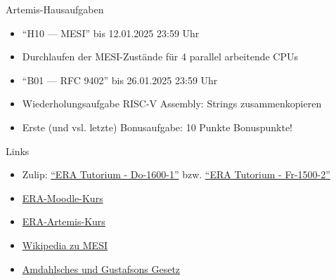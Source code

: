 \documentclass[
  german,            %
  aspectratio=169,    %
]{tumbeamer}
\begin{document}
\begin{frame}[c, fragile]{Artemis-Hausaufgaben}{}
	\begin{itemize}
		\item \enquote{H10 --- MESI} bis 12.01.2025 23:59 Uhr
		\item Durchlaufen der MESI-Zustände für 4 parallel arbeitende CPUs
	\end{itemize}
	\vspace{1cm}
	\begin{itemize}
		\item \enquote{B01 --- RFC 9402} bis 26.01.2025 23:59 Uhr
		\item Wiederholungsaufgabe RISC-V Assembly: Strings zusammenkopieren
		\item Erste (und vsl. letzte) Bonusaufgabe: 10 Punkte Bonuspunkte!
	\end{itemize}
\end{frame}

\begin{frame}[c, fragile]{Links}{}
	\begin{itemize}
		\item Zulip: \href{https://zulip.in.tum.de/#narrow/stream/2661-ERA-Tutorium---Do-1600-1}{\enquote{ERA Tutorium - Do-1600-1}}
		      bzw. \href{https://zulip.in.tum.de/#narrow/stream/2675-ERA-Tutorium---Fr-1500-2 }{\enquote{ERA Tutorium - Fr-1500-2}}
		\item \href{https://www.moodle.tum.de/course/view.php?id=100633}{ERA-Moodle-Kurs}
		\item \href{https://artemis.in.tum.de/courses/401}{ERA-Artemis-Kurs}
		\item \href{https://de.wikipedia.org/wiki/MESI}{Wikipedia zu MESI}
		\item \href{https://www.educative.io/answers/difference-between-amdahls-and-gustafsons-laws}{Amdahlsches und Gustafsons Gesetz}
	\end{itemize}
\end{frame}

\maketitle
\end{document}
